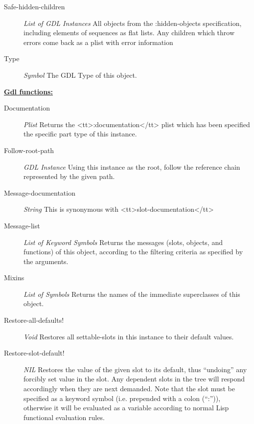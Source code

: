 \documentclass [11pt]{book}
\begin{document}
\begin{itemize}
\begin{description}
\item [Safe-hidden-children]
\emph{List of GDL Instances} All objects from the :hidden-objects specification, including elements of sequences
as flat lists. Any children which throw errors come back as a plist with error information


\item [Type]
\emph{Symbol} The GDL Type of this object.


\end{description}






\textbf{
\underline{Gdl functions:}}

\begin{description}

\item [Documentation]
\emph{Plist} Returns the <tt>:documentation</tt> plist which has been specified the
specific part type of this instance.


\item [Follow-root-path]
\emph{GDL Instance} Using this instance as the root, follow the reference chain
represented by the given path.


\item [Message-documentation]
\emph{String} This is synonymous with <tt>slot-documentation</tt>


\item [Message-list]
\emph{List of Keyword Symbols} Returns the messages (slots, objects, and functions) of this object, according to the filtering criteria as specified by the arguments.


\item [Mixins]
\emph{List of Symbols} Returns the names of the immediate superclasses of this object.


\item [Restore-all-defaults!]
\emph{Void} Restores all settable-slots in this instance to their default values.


\item [Restore-slot-default!]
\emph{NIL} Restores the value of the given slot to its default, thus ``undoing'' any forcibly set value
in the slot. Any dependent slots in the tree will respond accordingly when they are next demanded.
Note that the slot must be specified as a keyword symbol (i.e. prepended with a colon (``:'')),
otherwise it will be evaluated as a variable according to normal Lisp functional evaluation rules.



\end{description}
\end{itemize}
\end{document}
